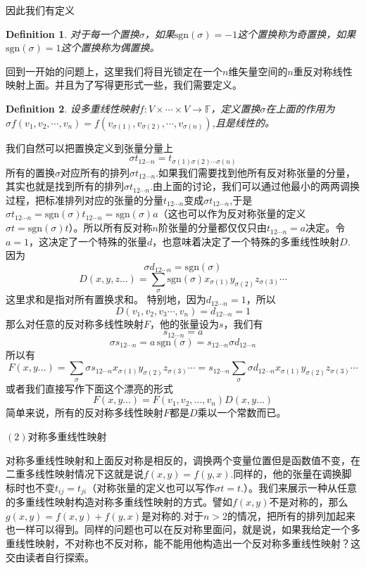 \documentclass[11pt,a4paper,openany]{book}%
\theoremstyle{plain}%
\newtheorem{defi}{Definition}[chapter]%
\newcommand{\NO}[1]{{$(#1)$}}%
\begin{document}
\noindent 因此我们有定义
\begin{defi}
对于每一个置换$\sigma$，如果$\mathrm{sgn}(\sigma)=-1$这个置换称为奇置换，如果$\mathrm{sgn}(\sigma)=1$这个置换称为偶置换。
\end{defi}
\indent 回到一开始的问题上，这里我们将目光锁定在一个$n$维矢量空间的$n$重反对称线性映射上面。并且为了写得更形式一些，我们需要定义。
\begin{defi}
设多重线性映射$f:V\times \cdots \times V\rightarrow \mathbb{F}$，定义置换$\sigma$在上面的作用为$\sigma f(v_1,v_2,\cdots,v_n)=f(v_{\sigma(1)},v_{\sigma(2)},\cdots,v_{\sigma(n)})$,且是线性的。
\end{defi}
我们自然可以把置换定义到张量分量上
\[
\sigma t_{12\cdots n}=t_{\sigma(1)\sigma(2)\cdots \sigma(n)}
\]
所有的置换$\sigma$对应所有的排列$\sigma t_{12\cdots n}$.如果我们需要找到他所有反对称张量的分量，其实也就是找到所有的排列$\sigma t_{12\cdots n}$.由上面的讨论，我们可以通过他最小的两两调换过程，把标准排列对应的张量的分量$t_{12\cdots n}$变成$\sigma t_{12\cdots n}$,于是$\sigma t_{12\cdots n}=\mathrm{sgn}(\sigma)t_{12\cdots n}=\mathrm{sgn}(\sigma)a$（这也可以作为反对称张量的定义$\sigma t= \mathrm{sgn}(\sigma)t$）。所以所有反对称$n$阶张量的分量都仅仅只由$t_{12\cdots n}=a$决定。令$a=1$，这决定了一个特殊的张量$d$，也意味着决定了一个特殊的多重线性映射$D$.
因为
\[
\sigma d_{12\cdots n}=\mathrm{sgn}(\sigma)
\]
\[
D(x,y,z…)=\sum_{\sigma}\mathrm{sgn}(\sigma)x_{\sigma(1)}y_{\sigma(2)}z_{\sigma(3)}\cdots
\]
这里求和是指对所有置换求和。
特别地，因为$d_{12\cdots n}=1$，所以
\[
D(v_1,v_2,v_3\cdots ,v_n)=d_{12\cdots n}=1
\]
那么对任意的反对称多线性映射$F$，他的张量设为$s$，我们有
\[
s_{12\cdots n}=a
\]
\[
\sigma s_{12\cdots n}=a\,\mathrm{sgn}(\sigma)=s_{12\cdots n}\sigma d_{12\cdots n}
\]
所以有
\[
F(x,y…)=\sum_{\sigma}\sigma s_{12\cdots n}x_{\sigma(1)}y_{\sigma(2)}z_{\sigma(3)}\cdots=s_{12\cdots n}\sum_{\sigma}\sigma d_{12\cdots n}x_{\sigma(1)}y_{\sigma(2)}z_{\sigma(3)}\cdots
\]
或者我们直接写作下面这个漂亮的形式
\begin{equation}
\label{a2}
F(x,y…)=F(v_1,v_2,…,v_n)D(x,y…)
\end{equation}
简单来说，所有的反对称多线性映射$F$都是$D$乘以一个常数而已。

\NO{2}对称多重线性映射

对称多重线性映射和上面反对称是相反的，调换两个变量位置但是函数值不变，在二重多线性映射情况下这就是说$f(x,y)=f(y,x)$.同样的，他的张量在调换脚标时也不变$t_{ij}=t_{ji}$（对称张量的定义也可以写作$\sigma t=t$.）。我们来展示一种从任意的多重线性映射构造对称多重线性映射的方式。譬如$f(x,y)$不是对称的，那么$g(x,y)=f(x,y)+f(y,x)$是对称的.对于$n>2$的情况，把所有的排列加起来也一样可以得到。同样的问题也可以在反对称里面问，就是说，如果我给定一个多重线性映射，不对称也不反对称，能不能用他构造出一个反对称多重线性映射？这交由读者自行探索。
\end{document}
